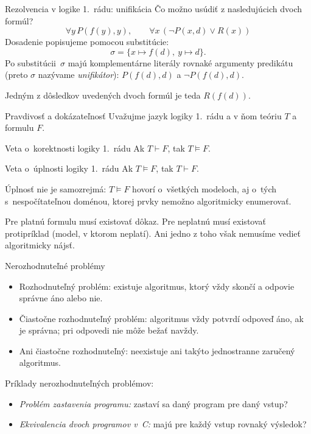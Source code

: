 \documentclass[12pt]{beamer}
\newcommand{\proves}{\vdash}
\newcommand{\entails}{\vDash}
\begin{document}
\begin{frame}{Rezolvencia v logike 1.~rádu: unifikácia}
Čo možno usúdiť z nasledujúcich dvoch formúl?
\[
  \forall y\,P(f(y),y),
  \qquad
  \forall x\,(\lnot P(x,d)\lor R(x))
\]
Dosadenie popisujeme pomocou substitúcie:
\[
  \sigma=\{x\mapsto f(d),\ y\mapsto d\}.
\]
Po substitúcii~$\sigma$ majú komplementárne literály rovnaké argumenty
predikátu (preto $\sigma$ nazývame \emph{unifikátor}):
$P(f(d),d)$ a $\lnot P(f(d),d)$.

Jedným z dôsledkov uvedených dvoch formúl je teda $R(f(d))$.
\end{frame}

\begin{frame}{Pravdivosť a dokázateľnosť}
  Uvažujme jazyk logiky 1.~rádu a v ňom teóriu $T$ a formulu $F$.
  \begin{block}{Veta o~korektnosti logiky 1.~rádu}
    Ak $T\proves F$, tak $T\entails F$.
  \end{block}
  \begin{block}{Veta o~úplnosti logiky 1.~rádu}
    Ak $T\entails F$, tak $T\proves F$.
  \end{block}

  Úplnosť nie je samozrejmá: $T\models F$ hovorí o~všetkých modeloch,
  aj o~tých s~nespočítateľnou doménou, ktorej prvky nemožno
  algoritmicky enumerovať.

  Pre platnú formulu musí existovať dôkaz. Pre neplatnú musí existovať protipríklad (model, v ktorom neplatí).
  Ani jedno z toho však nemusíme vedieť algoritmicky nájsť.
\end{frame}

\begin{frame}{Nerozhodnuteľné problémy}
\begin{itemize}
  \item \alert{Rozhodnuteľný problém:} existuje algoritmus, ktorý vždy skončí
        a odpovie správne áno alebo nie.
  \item \alert{Čiastočne rozhodnuteľný problém:} algoritmus vždy potvrdí
        odpoveď áno, ak je správna; pri odpovedi nie môže bežať navždy.
  \item \alert{Ani čiastočne rozhodnuteľný:} neexistuje ani takýto
        jednostranne zaručený algoritmus.
\end{itemize}

\medskip
Príklady nerozhodnuteľných problémov:
\begin{itemize}
  \item \emph{Problém zastavenia programu:} zastaví sa daný program pre daný vstup?
  \item \emph{Ekvivalencia dvoch programov v~C:} majú pre každý vstup rovnaký
    výsledok?
\end{itemize}
\end{frame}
\end{document}
